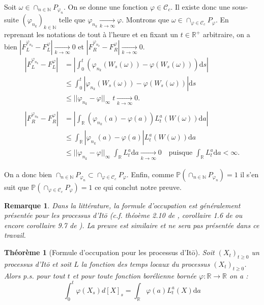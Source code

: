 \documentclass[openany]{book}
\makeatletter
\renewcommand{\P}{\mathds{P}}
\newcommand{\R}{\mathbb{R}}
\newcommand{\1}{\mathbbm{1}}
\renewcommand{\d}{\mathrm{d}}
\renewenvironment{proof}[1][\textbf{\textit{Démonstration}}]{%
  \par\pushQED{\qed}%
  \normalfont\topsep6\p@\@plus6\p@\relax
  \trivlist\item[\hskip\labelsep
    #1\@addpunct{.}]\ignorespaces
}{%
  \popQED\endtrivlist\@endpefalse
}
\theoremstyle{thmfont}
\newtheorem{theorem}{Théorème}[chapter]
\theoremstyle{deffont}
\theoremstyle{thmfont}
\theoremstyle{deffont}
\newtheorem{remark}[remark]{Remarque}
\makeatother
\begin{document}
\begin{proof}
  Soit $\omega \in \cap_{n\in \mathbb N}P_{\varphi_n}$. On se donne une fonction $\varphi \in \mathcal C_c$. Il existe donc une sous-suite $(\varphi_{n_k})_{k\in\mathbb N}$ telle que $\varphi_{n_k} \xrightarrow[k \to \infty]{} \varphi$. Montrons que $\omega \in \cap_{\varphi \in \mathcal C_c} P_\varphi$. En reprenant les notations de tout à l'heure et en fixant un $t \in \R^+$ arbitraire, on a bien $|F_L^{\varphi_{n_k}} - F_L^\varphi|\xrightarrow[k \to \infty]{} 0$ et $|F_R^{\varphi_{n_k}} - F_R^\varphi|\xrightarrow[k \to \infty]{} 0$.
%
\begin{align*}
  |F_L^{\varphi_{n_k}} - F_L^\varphi| &= \left|\int_0^t \left( \varphi_{n_k}(W_s(\omega)) - \varphi(W_s(\omega))\right)\d s\right|\\
                        &\leq \int_0^t \left| \varphi_{n_k}(W_s(\omega)) - \varphi(W_s(\omega))\right|\d s\\
                        &\leq ||\varphi_{n_k} - \varphi||_{\infty} \;t \xrightarrow[k \to \infty]{} 0.\\
  \\
  |F_R^{\varphi_{n_k}} - F_R^\varphi| &= \left|\int_\R \left( \varphi_{n_k}(a) - \varphi(a)\right) L_t^a(W(\omega))\d a\right|\\
                          &\leq \int_\R |\varphi_{n_k}(a) - \varphi(a)| L_t^a(W(\omega))\d a\\
                          &\leq ||\varphi_{n_k} - \varphi||_\infty \; \int_\R L_t^a\d a \xrightarrow[k\to \infty]{} 0\quad\text{puisque $\int_\R L_t^a\d a < \infty$.}
\end{align*}

\noindent On a donc bien $\cap_{n\in \mathbb N} P_{\varphi_n} \subset \cap_{\varphi \in \mathcal C_c} P_\varphi$. Enfin, comme $\P(\cap_{n\in \mathbb N} P_{\varphi_n}) = 1$ il s'en suit que $\P(\cap_{\varphi \in \mathcal C_c} P_\varphi) = 1$ ce qui conclut notre preuve.

\end{proof}

\begin{remark}
  Dans la littérature, la formule d'occupation est généralement présentée pour les processus d'Itō (c.f. théoème 2.10 de \cite{zambotti}, corollaire 1.6 de \cite{revuz-yor} ou encore corollaire 9.7 de \cite{legall}). La preuve est similaire et ne sera pas présentée dans ce travail.
\end{remark}

\begin{theorem}[Formule d'occupation pour les processus d'Itō]
  Soit $(X_t)_{t\geq0}$ un processus d'Itō et soit $L$ la fonction des temps locaux du processus $(X_t)_{t\geq0}$. Alors p.s. pour tout $t$ et pour toute fonction borélienne bornée $\varphi : \R \rightarrow \R$ on a :
  \begin{equation}
    \int_0^t \varphi(X_s) d[X]_s = \int_\R \varphi(a) L_t^a(X)\d a
  \end{equation}
  
\end{theorem}
\end{document}
